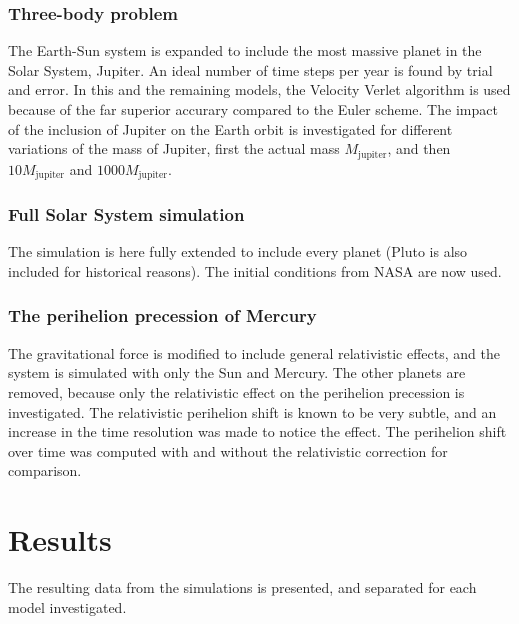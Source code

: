 \documentclass[aps,reprint]{revtex4-1}
\begin{document}
\subsubsection{Three-body problem}
The Earth-Sun system is expanded to include the most massive planet in the Solar System, Jupiter.
An ideal number of time steps per year is found by trial and error. In this and the remaining models, the Velocity
Verlet algorithm is used because of the far superior accurary compared to the
Euler scheme. The impact of the inclusion of Jupiter on the Earth orbit is investigated
for different variations of the mass of Jupiter, first the actual mass $M_\text{jupiter}$,
and then $10 M_\text{jupiter}$ and $1000 M_\text{jupiter}$.
\subsubsection{Full Solar System simulation}
The simulation is here fully extended to include every planet (Pluto is also included
for historical reasons). The initial conditions from NASA are now used.
\subsubsection{The perihelion precession of Mercury}
The gravitational force is modified to include general relativistic effects, and
the system is simulated with only the Sun and Mercury. The other planets are removed,
because only the relativistic effect on the perihelion precession is investigated.
The relativistic perihelion shift is known to be very subtle, and an increase in the time resolution
was made to notice the effect. The perihelion shift over time was computed with
and without the relativistic correction for comparison.
\section{Results}
The resulting data from the simulations is presented, and separated for each
model investigated.
\label{sec:results}
\end{document}
